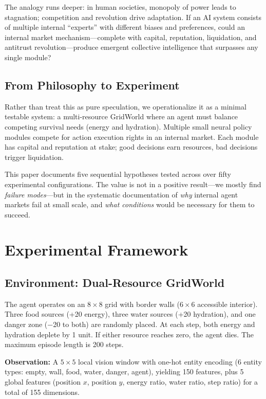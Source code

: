 \documentclass[a4paper,11pt]{article}
\begin{document}
The analogy runs deeper: in human societies, monopoly of power leads to stagnation; competition and revolution drive adaptation. If an AI system consists of multiple internal ``experts'' with different biases and preferences, could an internal market mechanism---complete with capital, reputation, liquidation, and antitrust revolution---produce emergent collective intelligence that surpasses any single module?

\subsection{From Philosophy to Experiment}

Rather than treat this as pure speculation, we operationalize it as a minimal testable system: a multi-resource GridWorld where an agent must balance competing survival needs (energy and hydration). Multiple small neural policy modules compete for action execution rights in an internal market. Each module has capital and reputation at stake; good decisions earn resources, bad decisions trigger liquidation.

This paper documents five sequential hypotheses tested across over fifty experimental configurations. The value is not in a positive result---we mostly find \textit{failure modes}---but in the systematic documentation of \textit{why} internal agent markets fail at small scale, and \textit{what conditions} would be necessary for them to succeed.

\section{Experimental Framework}

\subsection{Environment: Dual-Resource GridWorld}

The agent operates on an $8\times8$ grid with border walls ($6\times6$ accessible interior). Three food sources (+20 energy), three water sources (+20 hydration), and one danger zone ($-$20 to both) are randomly placed. At each step, both energy and hydration deplete by 1 unit. If either resource reaches zero, the agent dies. The maximum episode length is 200 steps.

\textbf{Observation:} A $5\times5$ local vision window with one-hot entity encoding (6 entity types: empty, wall, food, water, danger, agent), yielding 150 features, plus 5 global features (position $x$, position $y$, energy ratio, water ratio, step ratio) for a total of 155 dimensions.
\end{document}
